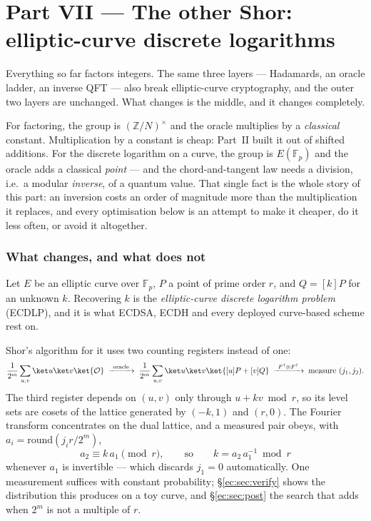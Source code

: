 
\clearpage
\part*{Part VII --- The other Shor: elliptic-curve discrete logarithms}

\begin{keybox}[title={Why a second half}]
Everything so far factors integers. The same three layers --- Hadamards, an oracle ladder, an
inverse QFT --- also break elliptic-curve cryptography, and the outer two layers are unchanged. What
changes is the middle, and it changes completely.

For factoring, the group is $(\mathbb{Z}/N)^\times$ and the oracle multiplies by a
\emph{classical} constant. Multiplication by a constant is cheap: Part~II built it out of shifted
additions. For the discrete logarithm on a curve, the group is $E(\mathbb{F}_p)$ and the oracle adds
a classical \emph{point} --- and the chord-and-tangent law needs a division, i.e.\ a modular
\emph{inverse}, of a quantum value. That single fact is the whole story of this part: an inversion
costs an order of magnitude more than the multiplication it replaces, and every optimisation below
is an attempt to make it cheaper, do it less often, or avoid it altogether.
\end{keybox}

\section{What changes, and what does not}\label{ec:sec:orient}

Let $E$ be an elliptic curve over $\mathbb{F}_p$, $P$ a point of prime order $r$, and
$Q=[k]P$ for an unknown $k$. Recovering $k$ is the \emph{elliptic-curve discrete logarithm problem}
(ECDLP), and it is what ECDSA, ECDH and every deployed curve-based scheme rest on.

Shor's algorithm for it \cite{ec:proos-zalka} uses two counting registers instead of one:
\[
\frac{1}{2^{m}}\sum_{u,v}\ket u\ket v\ket{\mathcal O}
\;\xrightarrow{\ \text{oracle}\ }\;
\frac{1}{2^{m}}\sum_{u,v}\ket u\ket v\ket{[u]P+[v]Q}
\;\xrightarrow{\ F^\dagger\otimes F^\dagger\ }\;
\text{measure } (j_1,j_2).
\]
The third register depends on $(u,v)$ only through $u+kv \bmod r$, so its level sets are cosets of
the lattice generated by $(-k,1)$ and $(r,0)$. The Fourier transform concentrates on the dual
lattice, and a measured pair obeys, with $a_i=\mathrm{round}(j_i r/2^{m})$,
\begin{equation}\label{ec:eq:post}
a_2 \equiv k\,a_1 \pmod r,
\qquad\text{so}\qquad
k = a_2\,a_1^{-1} \bmod r
\end{equation}
whenever $a_1$ is invertible --- which discards $j_1=0$ automatically. One measurement suffices with
constant probability; \S\ref{ec:sec:verify} shows the distribution this produces on a toy curve, and
\S\ref{ec:sec:post} the search that \cite{ec:ekera} adds when $2^m$ is not a multiple of $r$.

